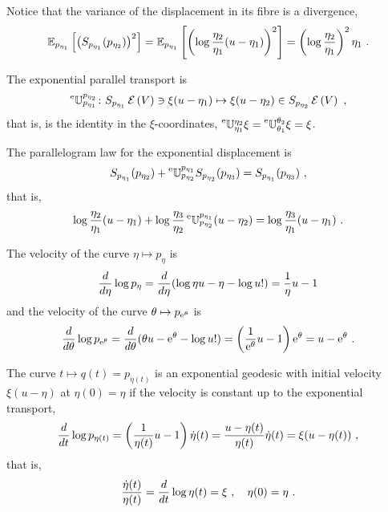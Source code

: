 \documentclass[12pt,a4paper]{amsart}
\begin{document}
Notice that the variance of the displacement in its fibre is a divergence,
\begin{equation}
  \label{eq:22}
  \expectat {p_{\eta_1}} {\left(S_{p_{\eta_1}}(p_{\eta_2})\right)^2} =  \expectat {p_{\eta_1}} {\left(\log \frac {\eta_2}{\eta_1} (u - \eta_1)\right)^2} = \left(\log \frac {\eta_2}{\eta_1}\right)^2 \eta_1 \ .  
\end{equation}

The exponential parallel transport is
\begin{equation}
  \label{eq:10}
  \prescript{\text{e}}{} {\mathbb U} _ {p_{\eta_1}} ^ {p_{\eta_2}} \colon S_{p_{\eta_1}}\operatorname{\mathcal E}\left(V\right) \ni \xi(u - \eta_1) \mapsto \xi(u - \eta_2) \in S_{p_{\eta_2}}\operatorname{\mathcal E}\left(V\right) \ ,
\end{equation}
that is, is the identity in the $\xi$-coordinates, $\prescript{\text{e}}{} {\mathbb U} _ {\eta_1} ^ {\eta_2} \xi = \prescript{\text{e}}{} {\mathbb U} _ {\theta_1} ^ {\theta_2} \xi = \xi$.

The parallelogram law for the exponential displacement is 
\begin{equation}
  \label{eq:11}
  S_{p_{\eta_1}}(p_{\eta_2}) + \prescript{\text{e}}{} {\mathbb U} _ {p_{\eta_2}} ^ {p_{\eta_1}} S_{p_{\eta_2}}(p_{\eta_3}) = S_{p_{\eta_1}}(p_{\eta_3}) \ ,
\end{equation}
that is,
\begin{equation}
  \label{eq:12}
  \log \frac {\eta_2}{\eta_1}(u - \eta_1) + \log \frac {\eta_3}{\eta_2} \prescript{\text{e}}{} {\mathbb U} _ {p_{\eta_2}} ^ {p_{\eta_1}} (u - \eta_2) = \log \frac {\eta_3}{\eta_1}  (u - \eta_1) \ . 
\end{equation}

The velocity of the curve $\eta \mapsto p_\eta$ is
\begin{equation}
  \label{eq:13}
  \frac{d}{d\eta} \log p_\eta = \frac{d}{d\eta} (\log \eta u - \eta - \log u!) = \frac 1 \eta u - 1  
\end{equation}
and the velocity of the curve $\theta \mapsto p_{\mathrm{e}^\theta}$ is 
\begin{equation}
  \label{eq:14}
  \frac{d}{d\theta} \log p_{\mathrm{e}^\theta} = \frac{d}{d\theta} (\theta u - \mathrm{e}^\theta - \log u!) = \left(\frac 1 {\mathrm{e}^\theta} u - 1\right) \mathrm{e}^\theta = u - \mathrm{e}^\theta \ . 
\end{equation}

The curve $t \mapsto q(t) = p_{\eta(t)}$ is an exponential geodesic with initial velocity $\xi (u - \eta)$ at $\eta(0) = \eta$ if the velocity is constant up to the exponential transport,
\begin{equation}
  \label{eq:15}
  \frac{d}{dt} \log p_{\eta(t)} = \left(\frac 1 {\eta(t)} u - 1\right) \dot \eta(t) = \frac {u - \eta(t)} {\eta(t)} \dot \eta(t)=  \xi (u - \eta(t)) \ ,  
\end{equation}
that is,
\begin{equation}
  \label{eq:16}
  \frac {\dot \eta(t)} {\eta(t)} = \frac{d}{dt} \log \eta(t) = \xi \ , \quad  \eta(0) = \eta \ .
\end{equation}
\end{document}
